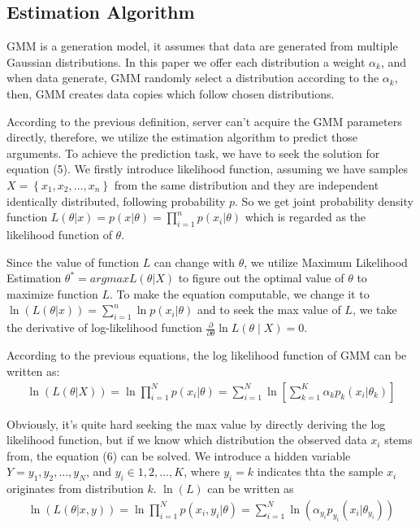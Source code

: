 \documentclass[conference]{IEEEtran}
\begin{document}
\subsection{Estimation Algorithm}
GMM is a generation model, it assumes that data are generated from multiple
Gaussian distributions. In this paper we offer each distribution a weight 
$\alpha_k$, and when data generate, GMM randomly select a distribution according
to the $\alpha_k$, then, GMM creates data copies which follow chosen distributions. 

According to the previous definition, server can't acquire the GMM parameters 
directly, therefore, we utilize the estimation algorithm to predict those arguments.
 To achieve the prediction task, we have to seek the solution for equation (5).
We firstly introduce likelihood function, assuming we have samples $X = \left\{x_1,x_2,\dots, x_n \right\}$ from
the same distribution and they are 
independent identically distributed, following probability $p$. 
So we get joint probability density function
$L(\theta|x) = p(x|\theta) = \prod_{i = 1}^{n} p(x_i|\theta)$
which is regarded as the likelihood function of $\theta$.

Since the value of function $L$ can change with $\theta$, we utilize
Maximum Likelihood Estimation $\theta^* = argmax  L(\theta|X)$ to figure out the optimal value
of $\theta$ to maximize function $L$.
To make the equation computable, we change it to 
   $ \ln (L(\theta|x)) = \sum_{i = 1}^{n} \ln p(x_i|\theta)$
and to seek the max value of $L$, we take the derivative of log-likelihood function
   $ \frac{\partial}{\partial \theta} \ln L(\theta \mid X)=0$.

According to the previous equations, the log likelihood function of GMM can be written as:
  \begin{align}
    \ln (L(\theta|X)) = \ln \prod_{i=1}^{N}p(x_i|\theta) = \sum_{i=1}^{N}\ln[\sum_{k=1}^{K}\alpha_k p_k(x_i|\theta_k)] 
  \end{align}

Obviously, it's quite hard seeking the max value by directly
deriving the log likelihood function, but if we know which 
distribution the observed data $x_i$ stems from, the equation (6) 
can be solved. We introduce a hidden variable $Y = y_1,y_2,\dots ,y_N$,
and $y_i \in 1,2,\dots ,K$, where $y_i = k$ 
indicates thta the sample $x_i$ originates from distribution $k$. 
$\ln(L)$ can be written as
  \begin{align}
    \ln (L(\theta|x,y)) = \ln \prod_{i = 1}^{N} p(x_i,y_i|\theta) = \sum_{i=1}^{N} \ln(\alpha_{y_i} p_{y_i}(x_i|\theta_{y_i}))
  \end{align}
\end{document}
